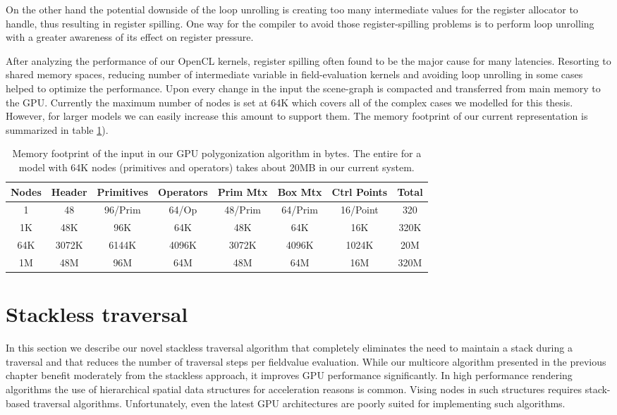 On the other hand the potential downside of the loop unrolling is creating too many intermediate values for the register allocator to handle, thus resulting in 
register spilling. One way for the compiler to avoid those register-spilling problems is to perform loop unrolling with a greater awareness of its effect on register 
pressure. 

After analyzing the performance of our OpenCL kernels, register spilling often found to be the major cause for many latencies. Resorting to shared memory spaces, reducing 
number of intermediate variable in field-evaluation kernels and avoiding loop unrolling in some cases helped to optimize the performance. Upon every
change in the input \blob the scene-graph is compacted and transferred from main memory to the GPU. Currently the maximum number of nodes is set at 64K which covers
all of the complex cases we modelled for this thesis. However, for larger \blob models  we can easily increase this amount to support them. The memory footprint of 
our current \blob representation is summarized in table \ref{table:memfootprint}).

\begin{table}[H]
\begin{center}
	 \caption{\label{table:memfootprint}
  {Memory footprint of the input \blob in our GPU polygonization algorithm in bytes. The entire \blob for a model with 64K nodes (primitives and operators) 
  takes about 20MB in our current system.}
}
  \begin{tabular}{ | c | c | c | c | c | c | c | c |}
    \hline    
    Nodes & Header & Primitives & Operators & Prim Mtx & Box Mtx & Ctrl Points & Total \\ \hline \hline
    1 & 48 & 96/Prim & 64/Op & 48/Prim & 64/Prim & 16/Point & 320 \\ \hline
    1K & 48K & 96K & 64K & 48K & 64K & 16K & 320K \\ \hline
    64K & 3072K & 6144K & 4096K & 3072K & 4096K & 1024K & 20M \\ \hline
    1M & 48M & 96M & 64M & 48M & 64M & 16M & 320M \\ 
    \hline
  	\end{tabular}
\end{center}
\end{table}


\section{Stackless \blob traversal}
\label{sec:stackless}
In this section we describe our novel stackless \blob traversal algorithm that completely eliminates the need to maintain a stack during a \blob
traversal and that reduces the number of traversal steps per fieldvalue evaluation. While our multicore algorithm presented in the previous chapter 
benefit moderately from the stackless approach, it improves GPU performance significantly. In high performance rendering algorithms the use of 
hierarchical spatial data structures for acceleration reasons is common. Vising nodes in such structures requires stack-based traversal 
algorithms. Unfortunately, even the latest GPU architectures are poorly suited for implementing such algorithms. 




